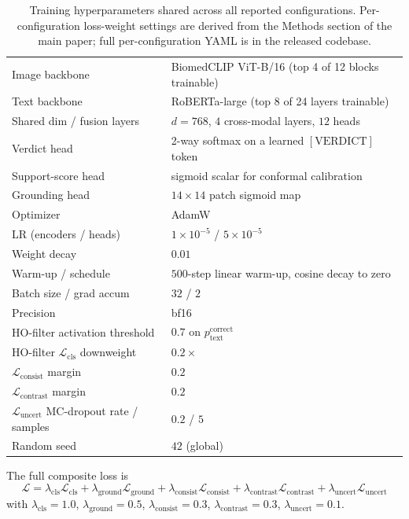 \documentclass{article}
\begin{document}
\begin{table}[t]
\centering
\small
\caption{Training hyperparameters shared across all reported
configurations. Per-configuration loss-weight settings are derived from
the Methods section of the main paper; full per-configuration YAML is in the
released codebase.}
\begin{tabular}{ll}
\toprule
Image backbone & BiomedCLIP ViT-B/16 (top 4 of 12 blocks trainable) \\
Text backbone & RoBERTa-large (top 8 of 24 layers trainable) \\
Shared dim / fusion layers & $d = 768$, $4$ cross-modal layers, $12$ heads \\
Verdict head & 2-way softmax on a learned $[\mathrm{VERDICT}]$ token \\
Support-score head & sigmoid scalar for conformal calibration \\
Grounding head & $14 \times 14$ patch sigmoid map \\
Optimizer & AdamW \\
LR (encoders / heads) & $1\times 10^{-5}$ / $5\times 10^{-5}$ \\
Weight decay & $0.01$ \\
Warm-up / schedule & $500$-step linear warm-up, cosine decay to zero \\
Batch size / grad accum & $32$ / $2$ \\
Precision & bf16 \\
HO-filter activation threshold & $0.7$ on $p_{\text{text}}^{\text{correct}}$ \\
HO-filter $\mathcal{L}_{\mathrm{cls}}$ downweight & $0.2\times$ \\
$\mathcal{L}_{\mathrm{consist}}$ margin & $0.2$ \\
$\mathcal{L}_{\mathrm{contrast}}$ margin & $0.2$ \\
$\mathcal{L}_{\mathrm{uncert}}$ MC-dropout rate / samples & $0.2$ / $5$ \\
Random seed & $42$ (global) \\
\bottomrule
\end{tabular}
\end{table}

The full composite loss is
\begin{equation*}
\mathcal{L} = \lambda_{\mathrm{cls}}\mathcal{L}_{\mathrm{cls}}
              + \lambda_{\mathrm{ground}}\mathcal{L}_{\mathrm{ground}}
              + \lambda_{\mathrm{consist}}\mathcal{L}_{\mathrm{consist}}
              + \lambda_{\mathrm{contrast}}\mathcal{L}_{\mathrm{contrast}}
              + \lambda_{\mathrm{uncert}}\mathcal{L}_{\mathrm{uncert}}
\end{equation*}
with $\lambda_{\mathrm{cls}} = 1.0$, $\lambda_{\mathrm{ground}} = 0.5$,
$\lambda_{\mathrm{consist}} = 0.3$, $\lambda_{\mathrm{contrast}} = 0.3$,
$\lambda_{\mathrm{uncert}} = 0.1$.
\end{document}
